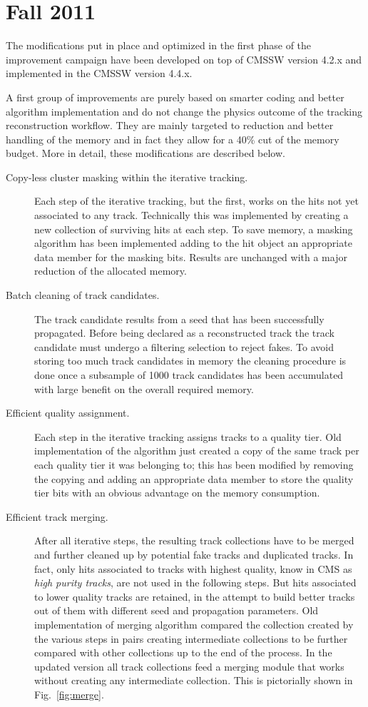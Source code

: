 \section{Fall 2011}
\label{fall11}

The modifications put in place and optimized in the first phase of the
improvement campaign have been developed on top of CMSSW version 4.2.x
and implemented in the CMSSW version 4.4.x. 

A first group of improvements are purely based on smarter coding
and better algorithm implementation and do not
change the physics outcome of the tracking reconstruction
workflow. They are mainly targeted to reduction and better handling of
the memory and in fact they allow for a 40\% cut of the
memory budget. More in detail, these modifications are described below.
\begin{description}
\item[Copy-less cluster masking within the iterative tracking.] Each
  step of the iterative tracking, but the first, works on the hits not
  yet associated to any track. Technically this was implemented by
  creating a new collection of surviving hits at each step. To save
  memory, a masking algorithm has been implemented adding to the hit
  object an appropriate data member for the masking bits. Results are
  unchanged with a major reduction of the allocated memory.
\item[Batch cleaning of track candidates.] The track candidate results
  from a seed that has been successfully propagated. Before being
  declared as a reconstructed track the track candidate must undergo
  a filtering selection to reject fakes. To
  avoid storing too much track candidates in memory the
  cleaning procedure is done once a subsample of 1000 track candidates
  has been accumulated with large benefit on the overall required memory.
\item[Efficient quality assignment.] Each step in
  the iterative tracking assigns tracks to a quality tier. Old
  implementation of the algorithm just created a copy of the same
  track per each quality tier it was belonging to; this has been
  modified by removing the copying and adding an appropriate data
  member to store the quality tier bits with an obvious advantage on
  the memory consumption.
\item[Efficient track merging.] After all iterative steps, the
  resulting track collections have to be merged and further cleaned up
  by potential fake tracks and duplicated tracks. In fact, only hits
  associated to tracks with highest quality, know in CMS as {\em high 
    purity tracks}, are not used in the following steps. But hits
  associated to lower quality tracks are retained, in the attempt to
  build better tracks out of them with different seed and propagation
  parameters. Old implementation of merging algorithm compared the
  collection created by the various steps in pairs creating intermediate
  collections to be further compared with other collections up to the
  end of the process. In the updated version all track collections
  feed a merging module that works without creating any intermediate
  collection. This is pictorially shown in Fig.~\ref{fig:merge}.
\end{description}

